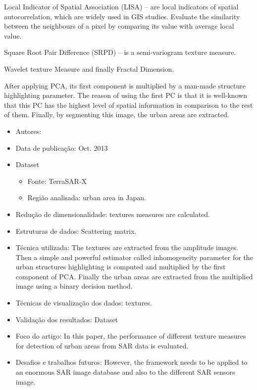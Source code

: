 \documentclass[paper=a4, fontsize=11pt]{scrartcl}
\begin{document}
Local Indicator of Spatial Association (LISA) -- are local indicators of spatial autocorrelation, which are widely used in GIS studies. Evaluate the similarity between the neighbours of a pixel by comparing its value with average local value.

Square Root Pair Difference (SRPD) -- is a semi-variogram texture measure.

Wavelet texture Measure and finally Fractal Dimension.

After applying PCA, its first component is multiplied by a man-made structure highlighting parameter. 
The reason of using the first PC is that it is well-known that this PC has the highest level of spatial information in comparison to the rest of them. Finally, by segmenting this image, the urban areas are extracted.

\begin{itemize}
    \item Autores:~\cite{aghababaee2013urban}
    \item Data de publicação: Oct. 2013
    \item Dataset
    \begin{itemize}
        \item Fonte: TerraSAR-X
        \item Região analisada: urban area in Japan.
    \end{itemize}
    \item Redução de dimensionalidade: textures measures are calculated.
    \item Estruturas de dados: Scattering matrix.
    \item Técnica utilizada:  The textures are extracted from the amplitude images. Then a simple and powerful estimator called inhomogeneity parameter for the urban structures highlighting is computed and multiplied by the first component of PCA. Finally the urban areas are extracted from the multiplied image using a binary decision method. 
    \item Técnicas de visualização dos dados: textures.
    \item Validação dos resultados: Dataset
    \item Foco do artigo: In this paper, the performance of different texture measures for detection of urban areas from SAR data is evaluated.
    \item Desafios e trabalhos futuros: However, the framework needs to be applied to an enormous SAR image database and also to the different SAR sensors image.
\end{itemize}
\end{document}
